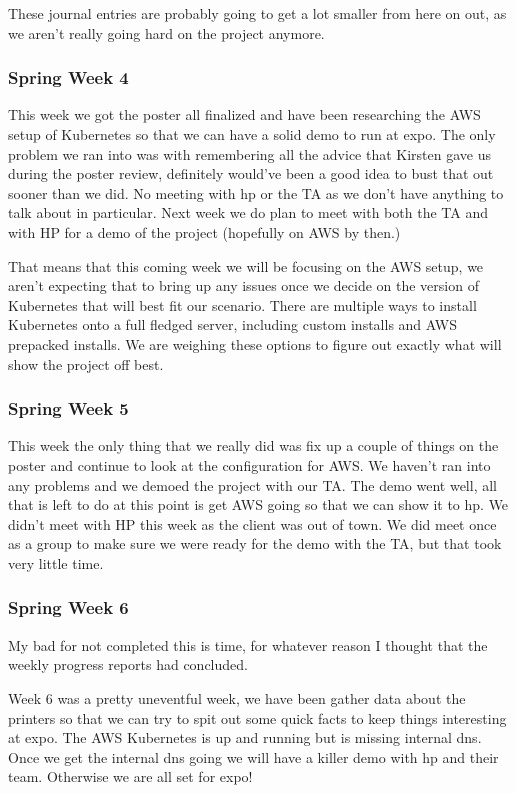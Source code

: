 \documentclass[onecolumn, draftclsnofoot,10pt, compsoc]{IEEEtran}
\begin{document}
These journal entries are probably going to get a lot smaller from here on out, as we aren't really going hard on the project anymore.

\subsubsection*{Spring Week 4}
This week we got the poster all finalized and have been researching the AWS setup of Kubernetes so that we can have a solid demo to run at expo. The only problem we ran into was with remembering all the advice that Kirsten gave us during the poster review, definitely would've been a good idea to bust that out sooner than we did. No meeting with hp or the TA as we don't have anything to talk about in particular. Next week we do plan to meet with both the TA and with HP for a demo of the project (hopefully on AWS by then.)

That means that this coming week we will be focusing on the AWS setup, we aren't expecting that to bring up any issues once we decide on the version of Kubernetes that will best fit our scenario. There are multiple ways to install Kubernetes onto a full fledged server, including custom installs and AWS prepacked installs. We are weighing these options to figure out exactly what will show the project off best.

\subsubsection*{Spring Week 5}
This week the only thing that we really did was fix up a couple of things on the poster and continue to look at the configuration for AWS. We haven't ran into any problems and we demoed the project with our TA. The demo went well, all that is left to do at this point is get AWS going so that we can show it to hp. We didn't meet with HP this week as the client was out of town. We did meet once as a group to make sure we were ready for the demo with the TA, but that took very little time.

\subsubsection*{Spring Week 6}
My bad for not completed this is time, for whatever reason I thought that the weekly progress reports had concluded.

Week 6 was a pretty uneventful week, we have been gather data about the printers so that we can try to spit out some quick facts to keep things interesting at expo. The AWS Kubernetes is up and running but is missing internal dns. Once we get the internal dns going we will have a killer demo with hp and their team. Otherwise we are all set for expo!
\end{document}
